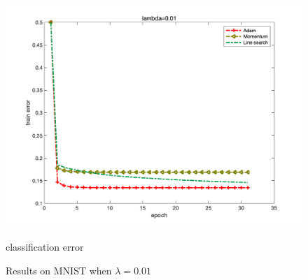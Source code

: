 \documentclass{article}
\begin{document}
\begin{figure}[H]
\begin{minipage}{0.33\linewidth}
		\includegraphics[width=1\linewidth]{./fig/err_m4}
		\caption{classification error}
	\end{minipage}
	\caption*{Results on MNIST when $\lambda=0.01$}
\end{figure}
\end{document}
